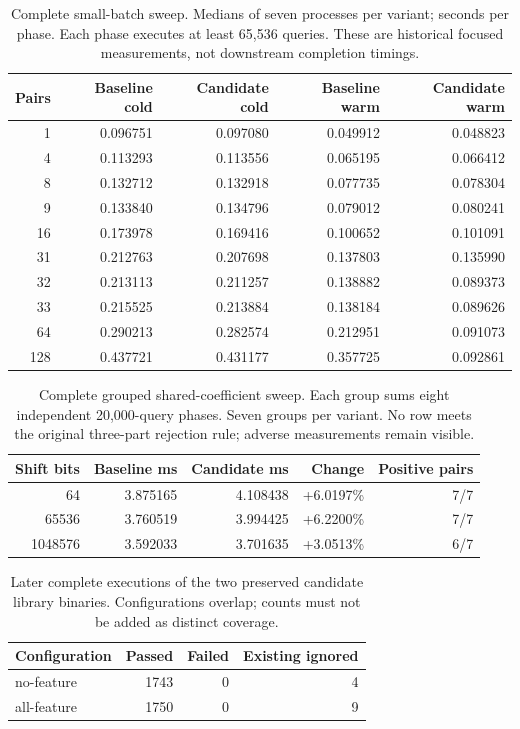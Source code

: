 \begin{table}[htbp]\centering\small
\caption{Complete small-batch sweep. Medians of seven processes per variant; seconds per phase. Each phase executes at least 65,536 queries. These are historical focused measurements, not downstream completion timings.}\label{tab:small}
\begin{tabular}{r r r r r}\toprule
Pairs & Baseline cold & Candidate cold & Baseline warm & Candidate warm\\\midrule
1 & 0.096751 & 0.097080 & 0.049912 & 0.048823\\
4 & 0.113293 & 0.113556 & 0.065195 & 0.066412\\
8 & 0.132712 & 0.132918 & 0.077735 & 0.078304\\
9 & 0.133840 & 0.134796 & 0.079012 & 0.080241\\
16 & 0.173978 & 0.169416 & 0.100652 & 0.101091\\
31 & 0.212763 & 0.207698 & 0.137803 & 0.135990\\
32 & 0.213113 & 0.211257 & 0.138882 & 0.089373\\
33 & 0.215525 & 0.213884 & 0.138184 & 0.089626\\
64 & 0.290213 & 0.282574 & 0.212951 & 0.091073\\
128 & 0.437721 & 0.431177 & 0.357725 & 0.092861\\
\bottomrule\end{tabular}\end{table}

\begin{table}[htbp]\centering\small
\caption{Complete grouped shared-coefficient sweep. Each group sums eight independent 20,000-query phases. Seven groups per variant. No row meets the original three-part rejection rule; adverse measurements remain visible.}\label{tab:shared}
\begin{tabular}{r r r r r}\toprule
Shift bits & Baseline ms & Candidate ms & Change & Positive pairs\\\midrule
64 & 3.875165 & 4.108438 & +6.0197\% & 7/7\\
65536 & 3.760519 & 3.994425 & +6.2200\% & 7/7\\
1048576 & 3.592033 & 3.701635 & +3.0513\% & 6/7\\
\bottomrule\end{tabular}\end{table}

\begin{table}[htbp]\centering\small
\caption{Later complete executions of the two preserved candidate library binaries. Configurations overlap; counts must not be added as distinct coverage.}\label{tab:suites}
\begin{tabular}{l r r r}\toprule
Configuration & Passed & Failed & Existing ignored\\\midrule
no-feature & 1743 & 0 & 4\\
all-feature & 1750 & 0 & 9\\
\bottomrule\end{tabular}\end{table}
